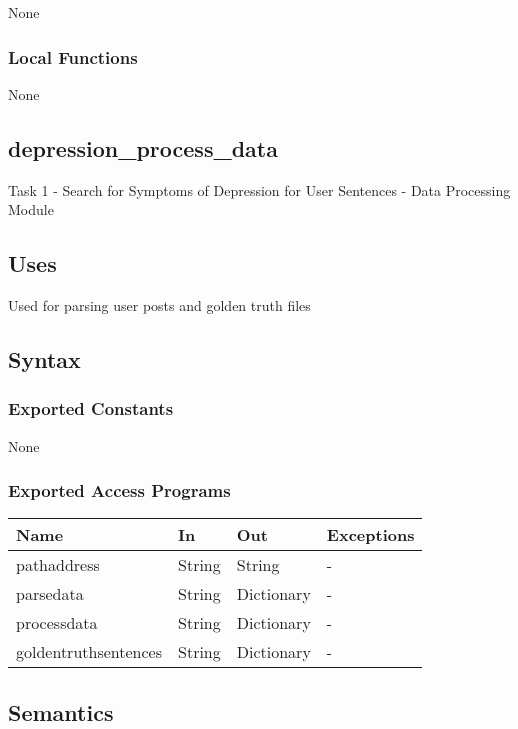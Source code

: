 \documentclass[12pt, titlepage]{article}
\begin{document}
None


\subsubsection{Local Functions}

None

\subsection{depression\_process\_data}

Task 1 - Search for Symptoms of Depression for User Sentences - Data Processing Module

\subsection{Uses}

Used for parsing user posts and golden truth files

\subsection{Syntax}

\subsubsection{Exported Constants}

None

\subsubsection{Exported Access Programs}

\begin{center}
\begin{tabular}{p{3.5cm} p{4.5cm} p{3cm} p{2cm}}
\hline
\textbf{Name} & \textbf{In} & \textbf{Out} & \textbf{Exceptions} \\
\hline
pathaddress & String & String & - \\
parsedata & String & Dictionary & - \\
processdata & String & Dictionary  & - \\
goldentruthsentences & String & Dictionary & - \\
\hline
\end{tabular}
\end{center}

\subsection{Semantics}
\end{document}
